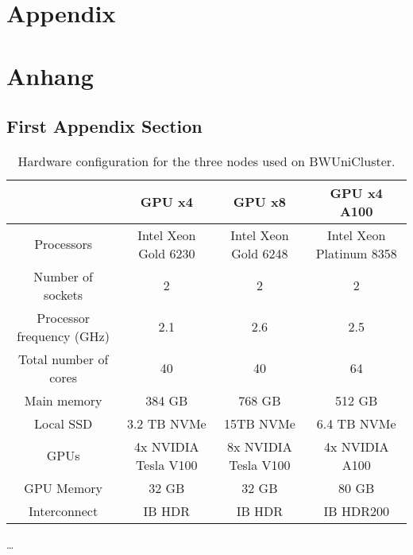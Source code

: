 
{\chapter{Appendix}}    %
{\chapter{Anhang}}      %
\label{chap:appendix}


\section{First Appendix Section}
\label{sec:appendix:FirstSection}
		
		

\begin{table}
    \begin{tabular}{c | c c c} 
        \hline
         & GPU x4 & GPU x8 & GPU x4 A100 \\ 
        \hline 
        Processors & Intel Xeon Gold 6230 & Intel Xeon Gold 6248 & Intel Xeon Platinum 8358  \\ 
        Number of sockets & 2 & 2 & 2  \\ 
        Processor frequency (GHz) & 2.1 & 2.6 & 2.5  \\ 
        Total number of cores & 40 & 40 & 64  \\ 
        Main memory & 384 GB & 768 GB & 512 GB  \\ 
        Local SSD & 3.2 TB NVMe & 15TB NVMe & 6.4 TB NVMe  \\ 
        GPUs & 4x NVIDIA Tesla V100 & 8x NVIDIA Tesla V100 & 4x NVIDIA A100  \\ 
        GPU Memory & 32 GB  & 32 GB & 80 GB  \\ 
        Interconnect & IB HDR & IB HDR & IB HDR200  \\ 
        \hline
    \end{tabular}
    \caption{Hardware configuration for the three nodes used on BWUniCluster.}
    \label{fig:Testfig}
\end{table}

\dots
